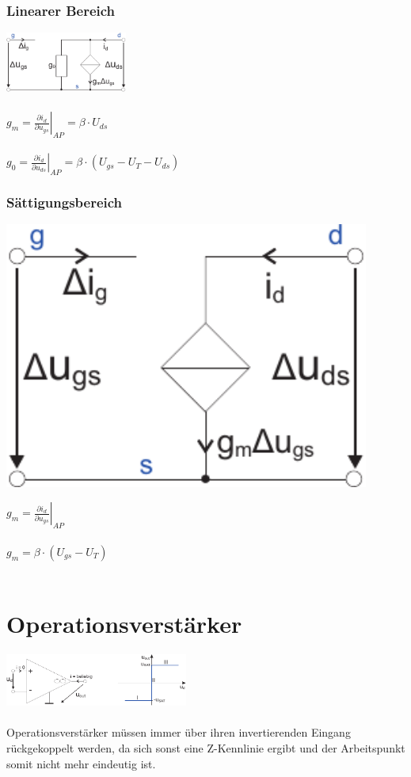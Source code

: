 \documentclass[a4paper,twocolumn,10pt]{article}
\begin{document}
\subsubsection*{Linearer Bereich}
\includegraphics[width=0.30\textwidth]{Grafiken/FET_KSE_lin}\\\\
$g_m=\left.\frac{\partial i_d}{\partial u_{gs}}\right|_{AP}=\beta \cdot U_{ds}$\\\\
$g_0=\left.\frac{\partial i_d}{\partial u_{ds}}\right|_{AP}=\beta \cdot (U_{gs}-U_T-U_{ds})$

\subsubsection*{Sättigungsbereich}
\begin{minipage}[b]{0.25\textwidth}
\includegraphics[width=0.9\textwidth]{Grafiken/FET_KSE_sat}
\end{minipage}
\hfill
\begin{minipage}[b]{0.2\textwidth}
$g_m=\left.\frac{\partial i_d}{\partial u_{gs}}\right|_{AP}$\\\\
$g_m=\beta \cdot (U_{gs}-U_T)$\\\\
\end{minipage}

\section*{Operationsverstärker}
\includegraphics[width=0.45\textwidth]{Grafiken/OP}\\\\
Operationsverstärker müssen immer über ihren invertierenden Eingang rückgekoppelt werden, da sich sonst eine Z-Kennlinie ergibt und der Arbeitspunkt somit nicht mehr eindeutig ist.
\end{document}
